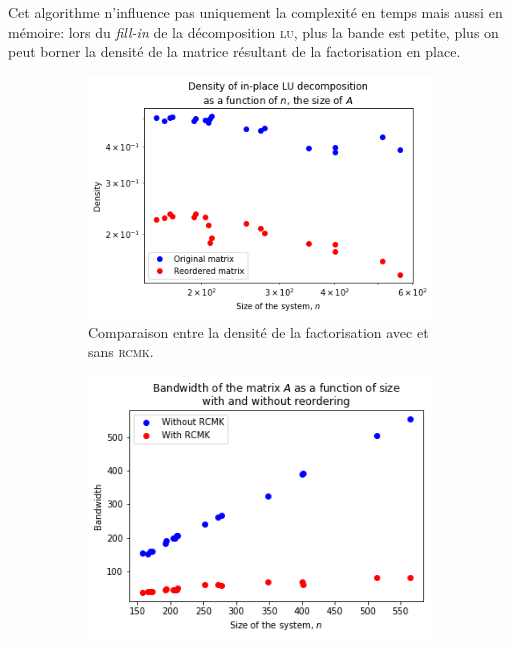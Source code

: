 \documentclass[11pt]{article}
\begin{document}
Cet algorithme n'influence pas uniquement la complexité en temps mais aussi en mémoire: lors du \emph{fill-in} de la décomposition \textsc{lu}, plus la bande est petite, plus on peut borner la densité de la matrice résultant de la factorisation en place.

\begin{figure}[H]
	\centering
	\begin{subfigure}[t]{0.27\textwidth}
		\centering
		\includegraphics[width=\linewidth]{rcmk_dens.png}
		\caption{Comparaison entre la densité de la factorisation avec et sans \textsc{rcmk}.}
		\label{fig:rcmk_dens}
	\end{subfigure}\hfill
	\begin{subfigure}[t]{0.27\textwidth}
		\centering
		\includegraphics[width=\linewidth]{bandwidth.png}

\end{subfigure}
\end{figure}
\end{document}
